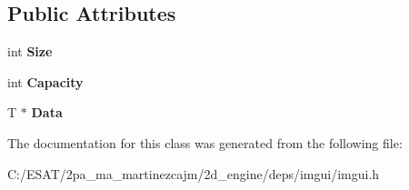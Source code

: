 \subsection*{Public Attributes}
\begin{DoxyCompactItemize}
\item 
\mbox{\label{class_im_vector_abbfd157947f66280d27b21d70a16df8d}} 
int {\bfseries Size}
\item 
\mbox{\label{class_im_vector_abd24482b4d30d22e37582e521e5bfb33}} 
int {\bfseries Capacity}
\item 
\mbox{\label{class_im_vector_ac0e46e8b30cb079d93c8f0aad7d7cbd0}} 
T $\ast$ {\bfseries Data}
\end{DoxyCompactItemize}


The documentation for this class was generated from the following file\+:\begin{DoxyCompactItemize}
\item 
C\+:/\+E\+S\+A\+T/2pa\+\_\+ma\+\_\+martinezcajm/2d\+\_\+engine/deps/imgui/imgui.\+h\end{DoxyCompactItemize}
